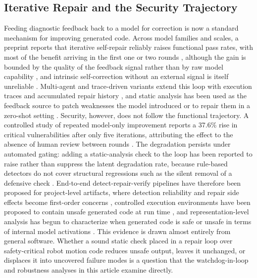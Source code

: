 \documentclass{ieeeaccess}
\begin{document}
\subsection{Iterative Repair and the Security Trajectory}
Feeding diagnostic feedback back to a model for correction is now a standard
mechanism for improving generated code. Across model families and scales, a preprint reports that iterative
self-repair reliably raises functional pass rates, with most of the benefit arriving
in the first one or two rounds \cite{ref47}, although the gain is bounded by the
quality of the feedback signal rather than by raw model capability \cite{ref48}, and
intrinsic self-correction without an external signal is itself unreliable
\cite{ref49}. Multi-agent and trace-driven variants extend this loop with execution
traces and accumulated repair history \cite{ref50}, and static analysis has been
used as the feedback source to patch weaknesses the model introduced \cite{ref51}
or to repair them in a zero-shot setting \cite{ref52}. Security, however, does not
follow the functional trajectory. A controlled study of repeated model-only
improvement reports a 37.6\% rise in critical vulnerabilities after only five
iterations, attributing the effect to the absence of human review between rounds
\cite{ref53}. The degradation persists under automated gating: adding a
static-analysis check to the loop has been reported to raise rather than suppress
the latent degradation rate, because rule-based detectors do not cover structural
regressions such as the silent removal of a defensive check \cite{ref54}.
End-to-end detect-repair-verify pipelines have therefore been proposed for
project-level artifacts, where detection reliability and repair side effects become
first-order concerns \cite{ref55}, controlled execution environments have been
proposed to contain unsafe generated code at run time \cite{ref56}, and
representation-level analysis has begun to characterize when generated code is safe
or unsafe in terms of internal model activations \cite{ref57}. This evidence is
drawn almost entirely from general software. Whether a sound static check placed in
a repair loop over safety-critical robot motion code reduces unsafe output, leaves
it unchanged, or displaces it into uncovered failure modes is a question that the
watchdog-in-loop and robustness analyses in this article examine directly.
\end{document}
